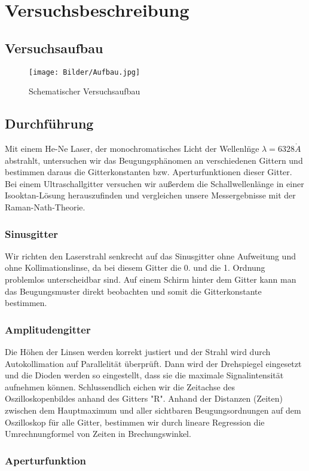 \section{Versuchsbeschreibung}

\subsection{Versuchsaufbau}
\begin{figure}
\centering \texttt{[image: Bilder/Aufbau.jpg]}
\caption{Schematischer Versuchsaufbau}
\end{figure}



\subsection{Durchf\"uhrung}

Mit einem He-Ne Laser, der monochromatisches Licht der Wellenl\"nge $\lambda = 6328 \mathring{A}$ abstrahlt, untersuchen wir das Beugungsph\"anomen an verschiedenen Gittern und bestimmen daraus die Gitterkonstanten bzw. Aperturfunktionen dieser Gitter. Bei einem Ultraschallgitter versuchen wir au\ss erdem die Schallwellenl\"ange in einer Isooktan-L\"osung herauszufinden und vergleichen unsere Messergebnisse mit der Raman-Nath-Theorie.

\subsubsection{Sinusgitter}

Wir richten den Laserstrahl senkrecht auf das Sinusgitter ohne Aufweitung und ohne Kollimationslinse, da bei diesem Gitter die 0. und die 1. Ordnung problemlos unterscheidbar sind. Auf einem Schirm hinter dem Gitter kann man das Beugungsmuster direkt beobachten und somit die Gitterkonstante bestimmen.

\subsubsection{Amplitudengitter}

Die H\"ohen der Linsen werden korrekt justiert und der Strahl wird durch Autokollimation auf Parallelit\"at \"uberpr\"uft. Dann wird der Drehspiegel eingesetzt und die Dioden werden so eingestellt, dass sie die maximale Signalintensit\"at aufnehmen k\"onnen. Schlussendlich eichen wir die Zeitachse des Oszilloskopenbildes anhand des Gitters "R". Anhand der Distanzen (Zeiten) zwischen dem Hauptmaximum und aller sichtbaren Beugungsordnungen auf dem Oszilloskop f\"ur alle Gitter, bestimmen wir durch lineare Regression die Umrechnungformel von Zeiten in Brechungswinkel.

\subsubsection{Aperturfunktion}

\clearpage
